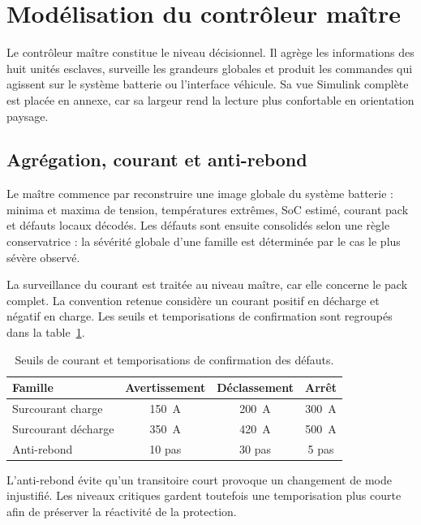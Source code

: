 \section{Modélisation du contrôleur maître}
\label{sec:ch4_controleur_maitre}

Le contrôleur maître constitue le niveau décisionnel. Il agrège les informations des huit unités esclaves, surveille les grandeurs globales et produit les commandes qui agissent sur le système batterie ou l'interface véhicule. Sa vue Simulink complète est placée en annexe, car sa largeur rend la lecture plus confortable en orientation paysage.

\subsection{Agrégation, courant et anti-rebond}
\label{subsec:ch4_agregation_maitre}

Le maître commence par reconstruire une image globale du système batterie : minima et maxima de tension, températures extrêmes, SoC estimé, courant pack et défauts locaux décodés. Les défauts sont ensuite consolidés selon une règle conservatrice : la sévérité globale d'une famille est déterminée par le cas le plus sévère observé.

\noindent
La surveillance du courant est traitée au niveau maître, car elle concerne le pack complet. La convention retenue considère un courant positif en décharge et négatif en charge. Les seuils et temporisations de confirmation sont regroupés dans la table~\ref{tab:ch4_seuils_courant_debounce}.

\begin{table}[H]
  \centering
  \small
  \begin{tabular}{|l|c|c|c|}
    \hline
    \textbf{Famille} & \textbf{Avertissement} & \textbf{Déclassement} & \textbf{Arrêt} \\
    \hline
    Surcourant charge & 150~A & 200~A & 300~A \\
    \hline
    Surcourant décharge & 350~A & 420~A & 500~A \\
    \hline
    Anti-rebond & 10 pas & 30 pas & 5 pas \\
    \hline
  \end{tabular}
  \captionsetup{width=0.68\textwidth, skip=15pt}
  \caption{Seuils de courant et temporisations de confirmation des défauts.}
  \label{tab:ch4_seuils_courant_debounce}
\end{table}

\noindent
L'anti-rebond évite qu'un transitoire court provoque un changement de mode injustifié. Les niveaux critiques gardent toutefois une temporisation plus courte afin de préserver la réactivité de la protection.


